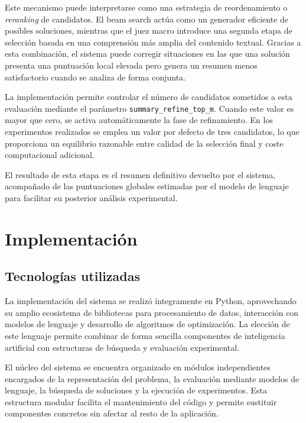 \documentclass[12pt,a4paper]{article}
\begin{document}
Este mecanismo puede interpretarse como una estrategia de reordenamiento o \textit{reranking} de candidatos. El beam search actúa como un generador eficiente de posibles soluciones, mientras que el juez macro introduce una segunda etapa de selección basada en una comprensión más amplia del contenido textual. Gracias a esta combinación, el sistema puede corregir situaciones en las que una solución presenta una puntuación local elevada pero genera un resumen menos satisfactorio cuando se analiza de forma conjunta.

La implementación permite controlar el número de candidatos sometidos a esta evaluación mediante el parámetro \verb|summary_refine_top_m|. Cuando este valor es mayor que cero, se activa automáticamente la fase de refinamiento. En los experimentos realizados se emplea un valor por defecto de tres candidatos, lo que proporciona un equilibrio razonable entre calidad de la selección final y coste computacional adicional.

El resultado de esta etapa es el resumen definitivo devuelto por el sistema, acompañado de las puntuaciones globales estimadas por el modelo de lenguaje para facilitar su posterior análisis experimental.



\section{Implementación}

\subsection{Tecnologías utilizadas}

La implementación del sistema se realizó íntegramente en Python, aprovechando su amplio ecosistema de bibliotecas para procesamiento de datos, interacción con modelos de lenguaje y desarrollo de algoritmos de optimización. La elección de este lenguaje permite combinar de forma sencilla componentes de inteligencia artificial con estructuras de búsqueda y evaluación experimental.

El núcleo del sistema se encuentra organizado en módulos independientes encargados de la representación del problema, la evaluación mediante modelos de lenguaje, la búsqueda de soluciones y la ejecución de experimentos. Esta estructura modular facilita el mantenimiento del código y permite sustituir componentes concretos sin afectar al resto de la aplicación.
\end{document}

